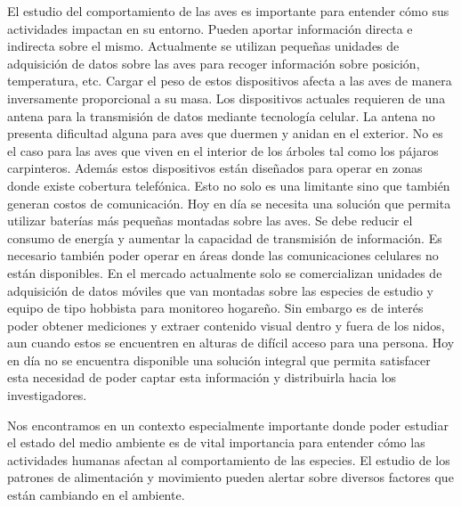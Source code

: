 %

%


El estudio del comportamiento de las aves es importante para entender cómo sus actividades impactan en su entorno. Pueden aportar información directa e indirecta sobre el mismo. Actualmente se utilizan pequeñas unidades de adquisición de datos sobre las aves para recoger información sobre posición, temperatura, etc. 
Cargar el peso de estos dispositivos afecta a las aves de manera inversamente proporcional a su masa.
Los dispositivos actuales requieren de una antena para la transmisión de datos mediante tecnología celular. La antena no presenta dificultad alguna para aves que duermen y anidan en el exterior. No es el caso para las  aves que viven en el interior de los árboles tal como los pájaros carpinteros. Además estos dispositivos están diseñados para operar en zonas donde existe cobertura telefónica. Esto no solo es una limitante sino que también generan costos de comunicación.
Hoy en día se necesita una solución que permita utilizar baterías más pequeñas montadas sobre las aves. Se debe reducir el consumo de energía y aumentar la capacidad de transmisión de información. Es necesario también poder operar en áreas donde las comunicaciones celulares no están disponibles.
 En el mercado actualmente solo se comercializan unidades de adquisición de datos móviles que van montadas sobre las especies de estudio y equipo de tipo hobbista para monitoreo hogareño. Sin embargo es de interés poder obtener mediciones y extraer contenido visual dentro y fuera de los nidos, aun cuando estos se encuentren en alturas de difícil acceso para una persona. Hoy en día no se encuentra disponible una solución integral que permita satisfacer esta necesidad de poder captar esta información y distribuirla hacia los investigadores.



Nos encontramos en un contexto especialmente importante donde poder estudiar el estado del medio ambiente es de vital importancia para entender cómo las actividades humanas afectan al comportamiento de las especies. El estudio de los patrones de alimentación y movimiento pueden alertar sobre diversos factores que están cambiando en el ambiente.  


%